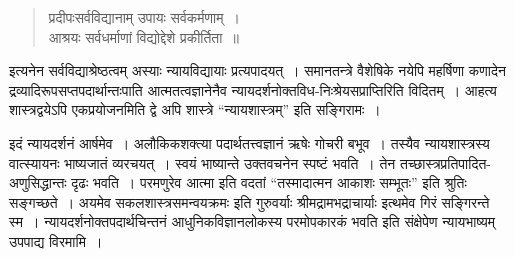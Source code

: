 {\begin{verse}
प्रदीपःसर्वविद्यानाम् उपायः सर्वकर्मणाम्~। \\
आश्रयः सर्वधर्माणां विद्योद्देशे प्रकीर्तिता~॥
\end{verse}

इत्यनेन सर्वविद्याश्रेष्ठत्वम् अस्याः न्यायविद्यायाः प्रत्यपादयत्~। समानतन्त्रे वैशेषिके \-नयेपि महर्षिणा कणादेन द्रव्यादिरूपसप्तपदार्थान्तःपाति आत्मतत्वज्ञानेनैव न्यायदर्शनोक्त\-विध-निःश्रेयसप्राप्तिरिति विदितम्~। आहत्य शास्त्रद्वयेऽपि एकप्रयोजनमिति द्वे अपि शास्त्रे “न्यायशास्त्रम्” इति सङ्गिरामः~। 

इदं न्यायदर्शनं आर्षमेव~। अलौकिकशक्त्या पदार्थतत्त्वज्ञानं ऋषेः गोचरी बभूव~। तस्यैव न्यायशास्त्रस्य वात्स्यायनः भाष्यजातं व्यरचयत्~। स्वयं भाष्यान्ते उक्तवचनेन स्पष्टं भवति~। तेन तच्छास्त्रप्रतिपादित-अणुसिद्धान्तः दृढः भवति~।  परमणुरेव आत्मा इति वदतां “तस्मादात्मन आकाशः सम्भूतः” इति श्रुतिः सङ्गच्छते~।  अयमेव सकलशास्त्रसमन्वयक्रमः इति गुरुवर्याः श्रीमद्रामभद्राचार्याः इत्थमेव गिरं सङ्गिरन्ते स्म~। न्यायदर्शनोक्तपदार्थचिन्तनं आधुनिकविज्ञानलोकस्य परमोपकारकं भवति इति संक्षेपेण न्यायभाष्यम् उपपाद्य विरमामि~। 

\articleend
}
